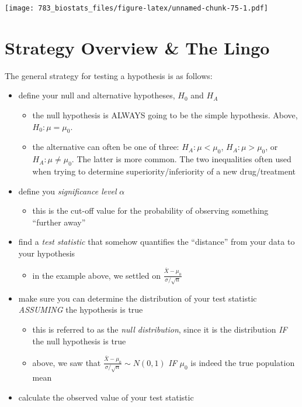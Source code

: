 \documentclass[]{book}
\providecommand{\tightlist}{%
  \setlength{\itemsep}{0pt}\setlength{\parskip}{0pt}}
\theoremstyle{definition}
\theoremstyle{definition}
\theoremstyle{definition}
\theoremstyle{remark}
\begin{document}
\texttt{[image: 783\_biostats\_files/figure-latex/unnamed-chunk-75-1.pdf]}

\hypertarget{strategy-overview-the-lingo}{%
\section{Strategy Overview \& The Lingo}\label{strategy-overview-the-lingo}}

The general strategy for testing a hypothesis is as follows:

\begin{itemize}
\tightlist
\item
  define your null and alternative hypotheses, \(H_0\) and \(H_A\)

  \begin{itemize}
  \tightlist
  \item
    the null hypothesis is ALWAYS going to be the simple hypothesis. Above, \(H_0: \mu = \mu_0\).
  \item
    the alternative can often be one of three: \(H_A: \mu < \mu_0\), \(H_A: \mu > \mu_0\), or \(H_A: \mu \neq \mu_0\). The latter is more common. The two inequalities often used when trying to determine superiority/inferiority of a new drug/treatment
  \end{itemize}
\item
  define you \emph{significance level} \(\alpha\)

  \begin{itemize}
  \tightlist
  \item
    this is the cut-off value for the probability of observing something ``further away''
  \end{itemize}
\item
  find a \emph{test statistic} that somehow quantifies the ``distance'' from your data to your hypothesis

  \begin{itemize}
  \tightlist
  \item
    in the example above, we settled on \(\frac{\bar{X} - \mu_0}{\sigma/\sqrt{n}}\)
  \end{itemize}
\item
  make sure you can determine the distribution of your test statistic \emph{ASSUMING} the hypothesis is true

  \begin{itemize}
  \tightlist
  \item
    this is referred to as the \emph{null distribution}, since it is the distribution \emph{IF} the null hypothesis is true
  \item
    above, we saw that \(\frac{\bar{X} - \mu_0}{\sigma/\sqrt{n}} \sim N(0,1)\) \emph{IF} \(\mu_0\) is indeed the true population mean
  \end{itemize}
\item
  calculate the observed value of your test statistic


\end{itemize}
\end{document}
